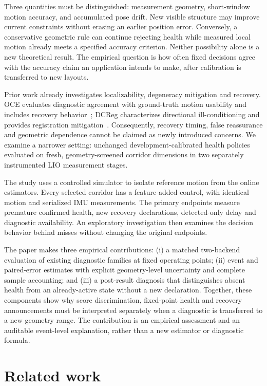 \documentclass[conference]{IEEEtran}
\begin{document}
Three quantities must be distinguished: measurement geometry, short-window
motion accuracy, and accumulated pose drift. New visible structure may
improve current constraints without erasing an earlier position error.
Conversely, a conservative geometric rule can continue rejecting health
while measured local motion already meets a specified accuracy criterion.
Neither possibility alone is a new theoretical result. The empirical
question is how often fixed decisions agree with the accuracy claim an
application intends to make, after calibration is transferred to new layouts.

Prior work already investigates localizability, degeneracy mitigation and
recovery. OCE evaluates diagnostic agreement with ground-truth motion
usability and includes recovery behavior~\cite{oce}; DCReg characterizes
directional ill-conditioning and provides registration mitigation~\cite{dcreg}.
Consequently, recovery timing, false reassurance and geometric dependence
cannot be claimed as newly introduced concerns. We examine a narrower
setting: unchanged development-calibrated health policies evaluated on
fresh, geometry-screened corridor dimensions in two separately instrumented
LIO measurement stages.

The study uses a controlled simulator to isolate reference motion from the
online estimators. Every selected corridor has a feature-added control,
with identical motion and serialized IMU measurements. The primary endpoints
measure premature confirmed health, new recovery declarations, detected-only
delay and diagnostic availability. An exploratory investigation then examines
the decision behavior behind misses without changing the original endpoints.

The paper makes three empirical contributions: (i) a matched two-backend evaluation
of existing diagnostic families at fixed operating points; (ii) event and
paired-error estimates with explicit geometry-level uncertainty and complete
sample accounting; and (iii) a post-result diagnosis that distinguishes
absent health from an already-active state without a new declaration.
Together, these components show why score discrimination, fixed-point health
and recovery announcements must be interpreted separately when a diagnostic
is transferred to a new geometry range. The contribution is an empirical
assessment and an auditable event-level explanation, rather than a new
estimator or diagnostic formula.

\section{Related work}
\end{document}
